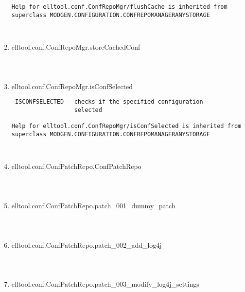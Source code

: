 \begin{enumerate}
\begin{lstlisting}
Help for elltool.conf.ConfRepoMgr/flushCache is inherited from superclass MODGEN.CONFIGURATION.CONFREPOMANAGERANYSTORAGE



\end{lstlisting}
\fontfamily{\familydefault}
\selectfont
\item {elltool.conf.ConfRepoMgr.storeCachedConf}
\selectfont
\begin{lstlisting}



\end{lstlisting}
\fontfamily{\familydefault}
\selectfont
\item {elltool.conf.ConfRepoMgr.isConfSelected}
\selectfont
\begin{lstlisting}
 ISCONFSELECTED - checks if the specified configuration
                  selected

Help for elltool.conf.ConfRepoMgr/isConfSelected is inherited from superclass MODGEN.CONFIGURATION.CONFREPOMANAGERANYSTORAGE



\end{lstlisting}
\fontfamily{\familydefault}
\selectfont
\item {elltool.conf.ConfPatchRepo.ConfPatchRepo}
\selectfont
\begin{lstlisting}



\end{lstlisting}
\fontfamily{\familydefault}
\selectfont
\item {elltool.conf.ConfPatchRepo.patch\_001\_dummy\_patch}
\selectfont
\begin{lstlisting}



\end{lstlisting}
\fontfamily{\familydefault}
\selectfont
\item {elltool.conf.ConfPatchRepo.patch\_002\_add\_log4j}
\selectfont
\begin{lstlisting}



\end{lstlisting}
\fontfamily{\familydefault}
\selectfont
\item {elltool.conf.ConfPatchRepo.patch\_003\_modify\_log4j\_settings}
\selectfont
\begin{lstlisting}




\end{lstlisting}
\end{enumerate}
